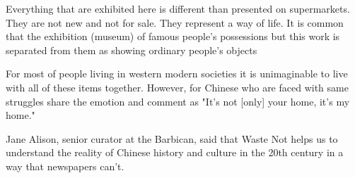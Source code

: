 Everything that are exhibited here is different than presented on supermarkets. They are not new and not for sale. They represent a way of life. It is common that the exhibition (museum) of famous people's possessions but this work is separated from them as showing ordinary people's objects

For most of people living in western modern societies it is unimaginable to live with all of these items together. However, for Chinese who are faced with same struggles share the emotion and  comment as "It's not [only] your home, it's my home."

Jane Alison, senior curator at the Barbican, said that Waste Not helps us to understand the reality of Chinese history and culture in the 20th century in a way that newspapers can't.




